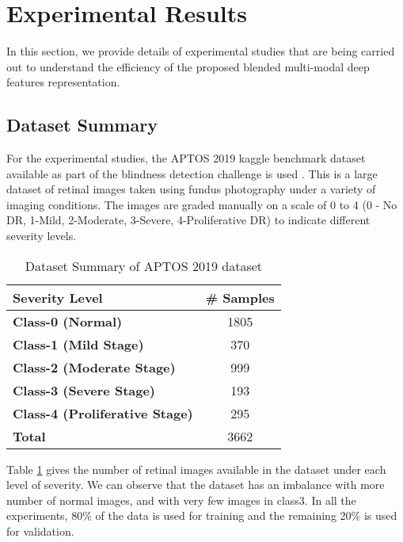 \documentclass[electronics,article,accept ,moreauthors,pdftex]{mdpi}
\begin{document}
\section{Experimental Results}
In this section, we provide details of experimental studies that are being carried out to understand the efficiency of the proposed blended multi-modal deep features representation. \subsection{Dataset Summary}
For the experimental studies, the APTOS 2019 kaggle benchmark dataset available as part of the blindness detection challenge is used \cite{APTOS}.
This is a large dataset of retinal images taken using fundus photography under a variety of imaging conditions. The images are graded manually on a scale of 0 to 4 (0 - No DR, 1-Mild, 2-Moderate, 3-Severe, 4-Proliferative DR) to indicate different  severity levels.
\begin{table}[htbp]
    \begin{center}        \renewcommand{\arraystretch}{1.5}                \begin{tabular}{|l|c|}
            \hline
            \textbf{Severity Level} & \textbf{\# Samples} \\ \hline
            \textbf{Class-0 (Normal)} & 1805 \\ \hline
            \textbf{Class-1 (Mild Stage)} & 370\\ \hline
            \textbf{Class-2 (Moderate Stage)} & 999 \\ \hline
            \textbf{Class-3 (Severe Stage)} & 193\\ \hline
            \textbf{Class-4 (Proliferative Stage)} & 295\\ \hline
            \textbf{Total} & 3662\\ \hline
        \end{tabular}
        \caption{Dataset Summary of APTOS 2019 dataset} \label{tab:severity_dataset}
    \end{center}
\end{table}
\vspace{-2em}
Table \ref{tab:severity_dataset} gives the number of retinal images available in the dataset under each level of severity. We can observe that the dataset has an imbalance with more number of normal images, and with very few images in class3.
In all the experiments,  80\% of the data is used for training and the remaining 20\% is used for validation.
\end{document}
